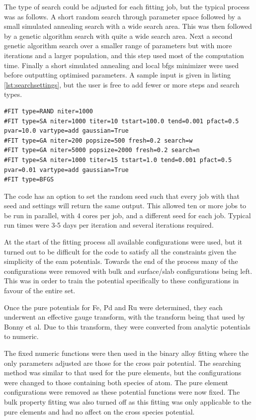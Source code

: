 The type of search could be adjusted for each fitting job, but the typical process was as follows.  A short random search through parameter space followed by a small simulated annealing search with a wide search area.  This was then followed by a genetic algorithm search with quite a wide search area.  Next a second genetic algorithm search over a smaller range of parameters but with more iterations and a larger population, and this step used most of the computation time.  Finally a short simulated annealing and local \acrshort{bfgs} minimizer were used before outputting optimised parameters.  A sample input is given in listing \ref{lst:searchsettings}, but the user is free to add fewer or more steps and search types.

\begin{lstlisting}[style=sEmail,caption={Parameter search settings when fitting in EAMPA}, label={lst:searchsettings}]
#FIT type=RAND niter=1000 
#FIT type=SA niter=1000 titer=10 tstart=100.0 tend=0.001 pfact=0.5 pvar=10.0 vartype=add gaussian=True
#FIT type=GA niter=200 popsize=500 fresh=0.2 search=w
#FIT type=GA niter=5000 popsize=2000 fresh=0.2 search=n
#FIT type=SA niter=1000 titer=15 tstart=1.0 tend=0.001 pfact=0.5 pvar=0.01 vartype=add gaussian=True
#FIT type=BFGS
\end{lstlisting}

The code has an option to set the random seed such that every job with that seed and settings will return the same output.  This allowed ten or more jobs to be run in parallel, with 4 cores per job, and a different seed for each job.  Typical run times were 3-5 days per iteration and several iterations required.

At the start of the fitting process all available configurations were used, but it turned out to be difficult for the code to satisfy all the constraints given the simplicity of the \acrshort{eam} potentials.  Towards the end of the process many of the configurations were removed with bulk and surface/slab configurations being left.  This was in order to train the potential specifically to these configurations in favour of the entire set.  

Once the pure potentials for Fe, Pd and Ru were determined, they each underwent an effective gauge transform, with the transform being that used by Bonny et al\cite{bonnyfecr}\cite{bonnymalerba}.  Due to this transform, they were converted from analytic potentials to numeric.  

The fixed numeric functions were then used in the binary alloy fitting where the only parameters adjusted are those for the cross pair potential.  The searching method was similar to that used for the pure elements, but the configurations were changed to those containing both species of atom.  The pure element configurations were removed as these potential functions were now fixed.  The bulk property fitting was also turned off as this fitting was only applicable to the pure elements and had no affect on the cross species potential.








